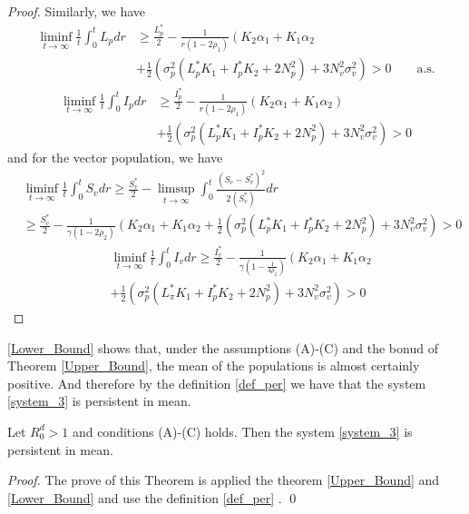 \begin{proof}
	Similarly, we have
	\begin{align*}
	 	\liminf
	 	\limits_{t \to \infty}
	 	\frac{1}{t}\int_{0}^{t} L_p dr
	 	&\geq
	 	\frac{L_p^*}{2} - 
	 	\frac{1}{ r(1 - 2 \rho_1)}
	 	\left(
	 		K_2 \alpha_1 + 
	 		K_1 \alpha_2
	 	\right.
	 	\\
	 	&+
	 	\frac{1}{2}
	 	\left(
	 		\sigma_p^2(
	 			L_p ^ *K_1 + 
	 			I_p ^* K_2 + 
	 			2 N_p ^ 2
	 		) + 
	 		3 N_v ^ 2 \sigma_v ^ 2
	 	\right)
	 	>0 \qquad\mbox{a.s.}
	\end{align*}
	\begin{align*}
	 	\liminf
	 	\limits_{t \to \infty}
	 	\frac{1}{t}
	 	\int_{0} ^ {t} I_p dr
	 	&
	 	\geq
	 	\frac{I_p ^ *}{2} - 
	 	\frac{1}{ r (1 - 2 \rho_1)}
	 	\left(
	 		K_2 \alpha_1 + 
	 		K_1 \alpha_2 
	 	\right)
	 	\\
 		&+
 		\frac{1}{2}
 		\left(
 			\sigma_p ^ 2
 			(
 				L_p ^* K_1 + 
 				I_p ^* K_2 + 
 				2 N_p ^ 2
 			) + 
 			3 N_v ^ 2
 			\sigma_v ^ 2
 		\right)>0
	\end{align*}
	and for the vector population, we have
	\begin{align*}
	 	&
	 	\liminf
	 	\limits_{t \to \infty}
	 	\frac{1}{t}
	 	\int_{0} ^ {t} 
	 		S_v 
	 	dr
	 	\geq
	 	\frac{S_v^*}{2}
	 	-
	 	\limsup_{t\to \infty}
	 	\int_{0} ^ {t}
	 	\frac{(S_v - S_v^*) ^ 2}{2 (S_v ^* )}dr
	 	\\
	 	&\geq
	 	\frac{S_v ^* }{2} - 
	 	\frac{1}{\gamma(1-2\rho_2)}
	 	\left(
	 		K_2 \alpha_1 + 
	 		K_1 \alpha_2
	 	\right.+
 		\frac{1}{2}
 		\left(
 			\sigma_p^2
 			(
 				L_p ^* K_1 + 
 				I_p ^* K_2 + 
 				2N_p ^2
 			) + 
 			3N_v ^ 2
 			\sigma_v ^ 2
 		\right) >0
	\end{align*}
%
 \begin{align*}
	 	&
	 	\liminf\limits_{t \to \infty}
	 	\frac{1}{t}\int_{0}^{t} I_v dr
	 	\geq
 		\frac{I_v^*}{2} - 
 		\frac{1}{
 			\gamma
 			(
 				1 - 
 				\frac{1}{4\rho_2}
 			)}
 		\left(
 			K_2 \alpha_1 + 
 			K_1 \alpha_2
 		\right.\\
	 	&+
	 	\frac{1}{2}
	 	\left(
	 		\sigma_p ^ 2
	 		(
	 			L_\pi ^* K_1 + 
	 			I_p ^ *K_2 + 
	 			2N_p ^ 2
	 		) + 
	 		3N_v ^ 2
	 		\sigma_v ^ 2
	 	\right)
	 	>0
 \end{align*}
\end{proof}
%
\begin{remark}
	\autoref{Lower_Bound} shows that, under the assumptions (A)-(C)
	and the bonud of Theorem \ref{Upper_Bound}, the mean of the 
	populations is almost certainly positive. And therefore by the 
	definition \ref{def_per} we have that the system \eqref{system_3} is 
	persistent in mean.
\end{remark}
%
\begin{theorem}
	Let $R^d_0>1$ and conditions (A)-(C) holds. 
	Then the system \eqref{system_3} is persistent in mean.
\end{theorem}
\begin{proof}
	The prove of this Theorem is applied the theorem \ref{Upper_Bound} and 
	\ref{Lower_Bound} and use the definition \ref{def_per} .
	\qed
\end{proof}
